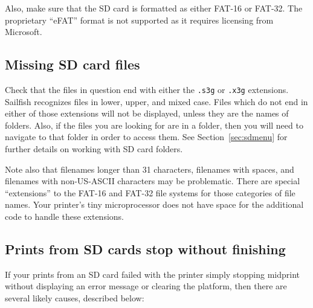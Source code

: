 Also, make sure that the SD card is formatted as either \gls{FAT-16} or
FAT-32. The proprietary ``eFAT'' format is not supported as it requires licensing from Microsoft.

\subsection{Missing SD card files}

Check that the files in question end with either the \texttt{.s3g} or
\texttt{.x3g} extensions.  Sailfish recognizes files in lower, upper,
and mixed case.  Files which do not end in either of those extensions
will not be displayed, unless they are the names of folders.  Also, if the files you are looking for are in a folder,
then you will need to navigate to that folder in order to access them.
See Section~\ref{sec:sdmenu} for further details on working with SD card
folders.

Note also that filenames longer than 31 characters, filenames with
spaces, and filenames with non-US-ASCII characters may be problematic.  There
are special ``extensions'' to the FAT-16 and FAT-32 file systems for those
categories of file names. Your printer's tiny microprocessor does not have
space for the additional code to handle these extensions.

\subsection{Prints from SD cards stop without finishing}

If your prints from an SD card failed with the printer simply
stopping midprint without displaying an error message or clearing
the platform, then there are several likely causes, described below:

